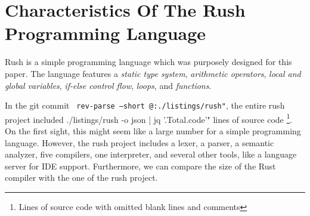 \section{Characteristics Of The Rush Programming Language}

Rush is a simple programming language which was purposely designed for this paper.
The language features a \emph{static type system}, \emph{arithmetic operators}, \emph{local and global variables}, \emph{if-else control flow}, \emph{loops}, and \emph{functions}.

In the git commit \texttt{ rev-parse --short @:./listings/rush"}, the entire rush project included
 ./listings/rush -o json | jq '.Total.code'" lines of source code \footnote{Lines of source code with omitted blank lines and comments}.
On the first sight, this might seem like a large number for a simple programming language.
However, the rush project includes a lexer, a parser, a semantic analyzer, five compilers, one interpreter, and several other tools, like a language server for IDE support.
Furthermore, we can compare the size of the Rust compiler with the one of the rush project.

